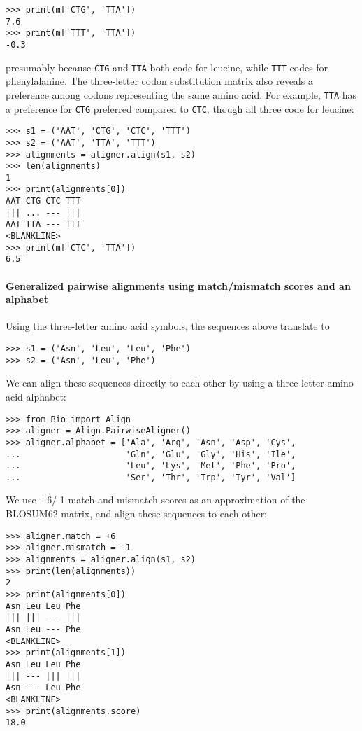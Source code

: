 \begin{verbatim}
>>> print(m['CTG', 'TTA'])
7.6
>>> print(m['TTT', 'TTA'])
-0.3
\end{verbatim}
presumably because \verb+CTG+ and \verb+TTA+ both code for leucine, while \verb+TTT+ codes for phenylalanine. The three-letter codon substitution matrix also reveals a preference among codons representing the same amino acid. For example, \verb+TTA+ has a preference for \verb+CTG+ preferred compared to \verb+CTC+, though all three code for leucine:

\begin{verbatim}
>>> s1 = ('AAT', 'CTG', 'CTC', 'TTT')
>>> s2 = ('AAT', 'TTA', 'TTT')
>>> alignments = aligner.align(s1, s2)
>>> len(alignments)
1
>>> print(alignments[0])
AAT CTG CTC TTT
||| ... --- |||
AAT TTA --- TTT
<BLANKLINE>
>>> print(m['CTC', 'TTA'])
6.5
\end{verbatim}

\paragraph*{Generalized pairwise alignments using match/mismatch scores and an alphabet}

Using the three-letter amino acid symbols, the sequences above translate to

\begin{verbatim}
>>> s1 = ('Asn', 'Leu', 'Leu', 'Phe')
>>> s2 = ('Asn', 'Leu', 'Phe')
\end{verbatim}
We can align these sequences directly to each other by using a three-letter amino acid alphabet:

\begin{verbatim}
>>> from Bio import Align
>>> aligner = Align.PairwiseAligner()
>>> aligner.alphabet = ['Ala', 'Arg', 'Asn', 'Asp', 'Cys',
...                     'Gln', 'Glu', 'Gly', 'His', 'Ile',
...                     'Leu', 'Lys', 'Met', 'Phe', 'Pro',
...                     'Ser', 'Thr', 'Trp', 'Tyr', 'Val']
\end{verbatim}
We use +6/-1 match and mismatch scores as an approximation of the BLOSUM62 matrix, and align these sequences to each other:

\begin{verbatim}
>>> aligner.match = +6
>>> aligner.mismatch = -1
>>> alignments = aligner.align(s1, s2)
>>> print(len(alignments))
2
>>> print(alignments[0])
Asn Leu Leu Phe
||| ||| --- |||
Asn Leu --- Phe
<BLANKLINE>
>>> print(alignments[1])
Asn Leu Leu Phe
||| --- ||| |||
Asn --- Leu Phe
<BLANKLINE>
>>> print(alignments.score)
18.0
\end{verbatim}

